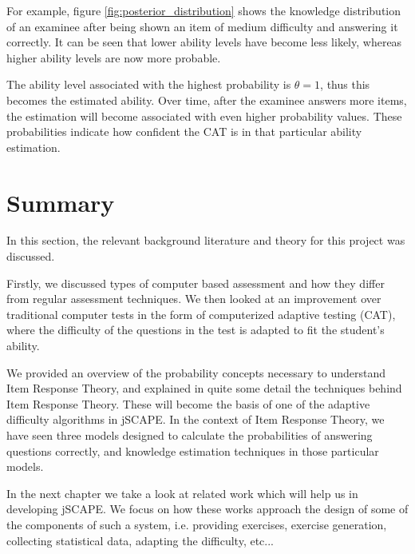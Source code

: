 For example, figure \ref{fig:posterior_distribution} shows the knowledge distribution of an examinee after being shown an item of medium difficulty and answering it correctly. It can be seen that lower ability levels have become less likely, whereas higher ability levels are now more probable.\newline

The ability level associated with the highest probability is $\theta=1$, thus this becomes the estimated ability. Over time, after the examinee answers more items, the estimation will become associated with even higher probability values. These probabilities indicate how confident the CAT is in that particular ability estimation.

\section{Summary}
In this section, the relevant background literature and theory for this project was discussed.\newline

Firstly, we discussed types of computer based assessment and how they differ from regular assessment techniques. We then looked at an improvement over traditional computer tests in the form of computerized adaptive testing (CAT), where the difficulty of the questions in the test is adapted to fit the student's ability. \newline

We provided an overview of the probability concepts necessary to understand Item Response Theory, and explained in quite some detail the techniques behind Item Response Theory. These will become the basis of one of the adaptive difficulty algorithms in jSCAPE. In the context of Item Response Theory, we have seen three models designed to calculate the probabilities of answering questions correctly, and knowledge estimation techniques in those particular models.\newline

In the next chapter we take a look at related work which will help us in developing jSCAPE. We focus on how these works approach the design of some of the components of such a system, i.e. providing exercises, exercise generation, collecting statistical data, adapting the difficulty, etc...